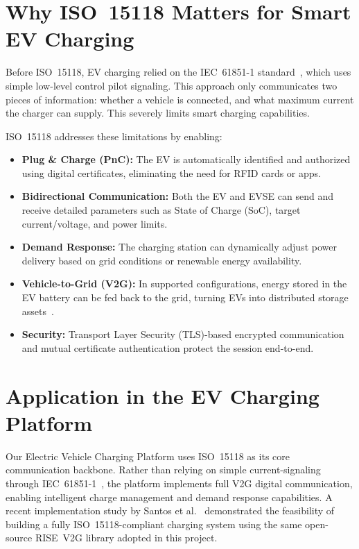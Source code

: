 \documentclass[12pt,a4paper]{report}
\begin{document}
\section{Why ISO~15118 Matters for Smart EV Charging}

Before ISO~15118, EV charging relied on the IEC~61851-1 standard~\autocite{iec61851_2017}, which uses
simple low-level control pilot signaling. This approach only communicates two pieces of information:
whether a vehicle is connected, and what maximum current the charger can supply. This severely
limits smart charging capabilities.

ISO~15118 addresses these limitations by enabling:

\begin{itemize}
  \item \textbf{Plug \& Charge (PnC):} The EV is automatically identified and authorized using
        digital certificates, eliminating the need for RFID cards or apps.

  \item \textbf{Bidirectional Communication:} Both the EV and EVSE can send and receive detailed
        parameters such as State of Charge (SoC), target current/voltage, and power limits.

  \item \textbf{Demand Response:} The charging station can dynamically adjust power delivery based
        on grid conditions or renewable energy availability.

  \item \textbf{Vehicle-to-Grid (V2G):} In supported configurations, energy stored in the EV
        battery can be fed back to the grid, turning EVs into distributed storage
        assets~\autocite{kempton2005}.

  \item \textbf{Security:} Transport Layer Security (TLS)-based encrypted communication and
        mutual certificate authentication protect the session end-to-end.
\end{itemize}

\section{Application in the EV Charging Platform}

Our Electric Vehicle Charging Platform uses ISO~15118 as its core communication backbone.
Rather than relying on simple current-signaling through IEC~61851-1~\autocite{iec61851_2017}, the
platform implements full V2G digital communication, enabling intelligent charge management and
demand response capabilities. A recent implementation study by Santos et al.~\autocite{santos2024}
demonstrated the feasibility of building a fully ISO~15118-compliant charging system using the
same open-source RISE~V2G library adopted in this project.
\end{document}
